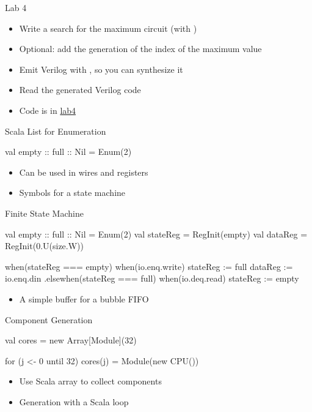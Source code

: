 \begin{frame}[fragile]{Lab 4}
\begin{itemize}
\item Write a search for the maximum circuit (with )
\item Optional: add the generation of the index of the maximum value
\item Emit Verilog with , so you can synthesize it
\item Read the generated Verilog code
\item Code is in \href{https://github.com/schoeberl/agile-hw/tree/main/lab4}{lab4}
\end{itemize}
\end{frame}




\begin{frame}[fragile]{Scala List for Enumeration}
\begin{chisel}
  val empty :: full :: Nil = Enum(2)
\end{chisel}
\begin{itemize}
\item Can be used in wires and registers
\item Symbols for a state machine
\end{itemize}
\end{frame}

\begin{frame}[fragile]{Finite State Machine}
\begin{chisel}
  val empty :: full :: Nil = Enum(2)
  val stateReg = RegInit(empty)
  val dataReg = RegInit(0.U(size.W))

  when(stateReg === empty) {
    when(io.enq.write) {
      stateReg := full
      dataReg := io.enq.din
    }
  }.elsewhen(stateReg === full) {
    when(io.deq.read) {
      stateReg := empty
    }
  }
\end{chisel}
\begin{itemize}
\item A simple buffer for a bubble FIFO
\end{itemize}
\end{frame}

\begin{frame}[fragile]{Component Generation}
\begin{chisel}
val cores = new Array[Module](32)

for (j <- 0 until 32)
  cores(j) = Module(new CPU())
\end{chisel}
\begin{itemize}
\item Use Scala array to collect components
\item Generation with a Scala loop
\end{itemize}
\end{frame}


